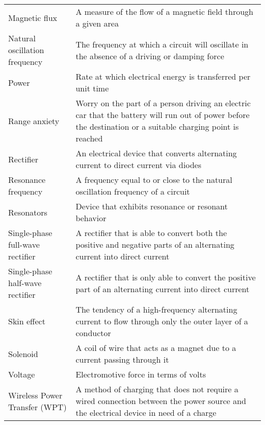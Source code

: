 \begin{supertabular}{p{0.2\textwidth}p{0.7\textwidth}}
Magnetic flux & A measure of the flow of a magnetic field through a given area \\
Natural oscillation frequency & The frequency at which a circuit will oscillate in the absence of a driving or damping force \\
Power & Rate at which electrical energy is transferred per unit time \\
Range anxiety & Worry on the part of a person driving an electric car that the battery will run out of power before the destination or a suitable charging point is reached \\
Rectifier & An electrical device that converts alternating current to direct current via diodes \\
Resonance frequency & A frequency equal to or close to the natural oscillation frequency of a circuit \\
Resonators & Device that exhibits resonance or resonant behavior \\
Single-phase full-wave rectifier & A rectifier that is able to convert both the positive and negative parts of an alternating current into direct current \\
Single-phase half-wave rectifier & A rectifier that is only able to convert the positive part of an alternating current into direct current \\
Skin effect & The tendency of a high-frequency alternating current to flow through only the outer layer of a conductor \\
Solenoid & A coil of wire that acts as a magnet due to a current passing through it \\
Voltage & Electromotive force in terms of volts \\
Wireless Power Transfer (WPT) & A method of charging that does not require a wired connection between the power source and the electrical device in need of a charge \\
\end{supertabular}

